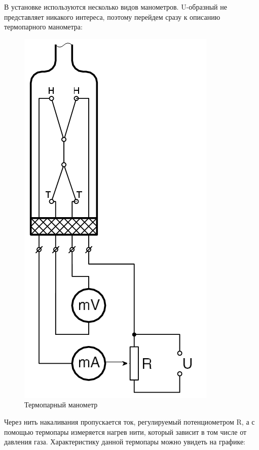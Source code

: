 \documentclass[12pt]{article}
\begin{document}
В установке используются несколько видов манометров. U-образный не представляет никакого интереса, поэтому перейдем сразу к описанию термопарного манометра:

\begin{figure}[H]
	\centering
	\includegraphics[scale = 0.3]{./images/ThermMan.png}
	\caption{Термопарный манометр}
\end{figure}
Через нить накаливания пропускается ток, регулируемый потенциометром R, а с помощью термопары измеряется нагрев нити, который зависит в том числе от давления газа. Характеристику данной термопары можно увидеть на графике:
\end{document}
